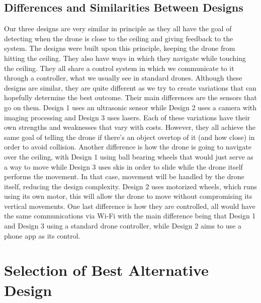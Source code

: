 \documentclass[12pt]{article}
\begin{document}
        \subsection{Differences and Similarities Between Designs}
            Our three designs are very similar in principle as they all have the goal of detecting when the drone is close to the ceiling and giving feedback to the system.
            The designs were built upon this principle, keeping the drone from hitting the ceiling.
            They also have ways in which they navigate while touching the ceiling.
            They all share a control system in which we communicate to it through a controller, what we usually see in standard drones.
            Although these designs are similar, they are quite different as we try to create variations that can hopefully determine the best outcome.
            Their main differences are the sensors that go on them.
            Design 1 uses an ultrasonic sensor while Design 2 uses a camera with imaging processing and Design 3 uses lasers.
            Each of these variations have their own strengths and weaknesses that vary with costs.
            However, they all achieve the same goal of telling the drone if there's an object overtop of it (and how close) in order to avoid collision.
            Another difference is how the drone is going to navigate over the ceiling, with Design 1 using ball bearing wheels that would just serve as a way to move while Design 3 uses skis in order to slide while the drone itself performs the movement.
            In that case, movement will be handled by the drone itself, reducing the design complexity.
            Design 2 uses motorized wheels, which runs using its own motor, this will allow the drone to move without compromising its vertical movements.
            One last difference is how they are controlled, all would have the same communications via Wi-Fi with the main difference being that Design 1 and Design 3 using a standard drone controller, while Design 2 aims to use a phone app as its control.

    \newpage
    \section{Selection of Best Alternative Design}
\end{document}
